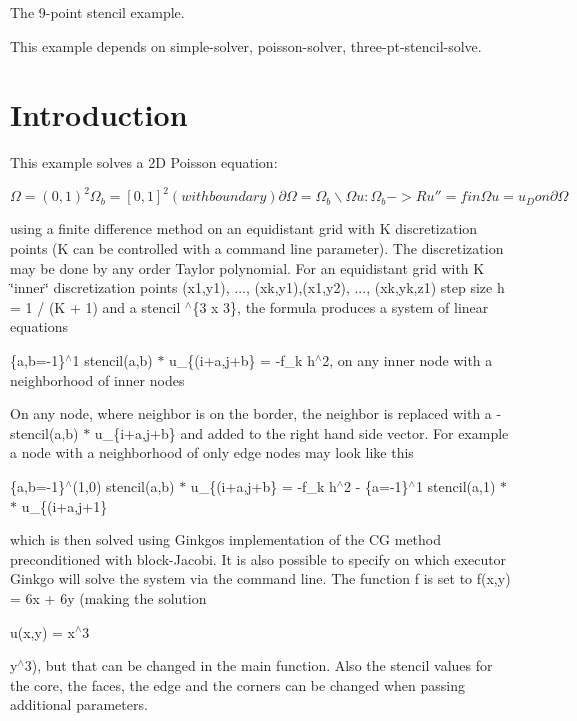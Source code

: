 The 9-\/point stencil example.

This example depends on simple-\/solver, poisson-\/solver, three-\/pt-\/stencil-\/solve.

 \label{_Intro}%
 \label{_Introduction}%
\section*{Introduction}

This example solves a 2D Poisson equation\+:

$ \Omega = (0,1)^2 \Omega_b = [0,1]^2 (with boundary) \partial\Omega = \Omega_b \backslash \Omega u : \Omega_b -> R u'' = f in \Omega u = u_D on \partial\Omega $

using a finite difference method on an equidistant grid with {\ttfamily K} discretization points ({\ttfamily K} can be controlled with a command line parameter). The discretization may be done by any order Taylor polynomial. For an equidistant grid with K \char`\"{}inner\char`\"{} discretization points (x1,y1), ..., (xk,y1),(x1,y2), ..., (xk,yk,z1) step size h = 1 / (K + 1) and a stencil  $^\wedge$\{3 x 3\}, the formula produces a system of linear equations

\{a,b=-\/1\}$^\wedge$1 stencil(a,b) $\ast$ u\+\_\+\{(i+a,j+b\} = -\/f\+\_\+k h$^\wedge$2, on any inner node with a neighborhood of inner nodes

On any node, where neighbor is on the border, the neighbor is replaced with a \textquotesingle{}-\/stencil(a,b) $\ast$ u\+\_\+\{i+a,j+b\}\textquotesingle{} and added to the right hand side vector. For example a node with a neighborhood of only edge nodes may look like this

\{a,b=-\/1\}$^\wedge$(1,0) stencil(a,b) $\ast$ u\+\_\+\{(i+a,j+b\} = -\/f\+\_\+k h$^\wedge$2 -\/ \{a=-\/1\}$^\wedge$1 stencil(a,1) $\ast$ $\ast$ u\+\_\+\{(i+a,j+1\}

which is then solved using Ginkgo\textquotesingle{}s implementation of the CG method preconditioned with block-\/\+Jacobi. It is also possible to specify on which executor Ginkgo will solve the system via the command line. The function {\ttfamily f} is set to {\ttfamily f(x,y) = 6x + 6y} (making the solution {\ttfamily u(x,y) = x$^\wedge$3
\begin{DoxyItemize}
\item y$^\wedge$3), but that can be changed in the {\ttfamily main} function. Also the stencil values for the core, the faces, the edge and the corners can be changed when passing additional parameters.
\end{DoxyItemize}}

